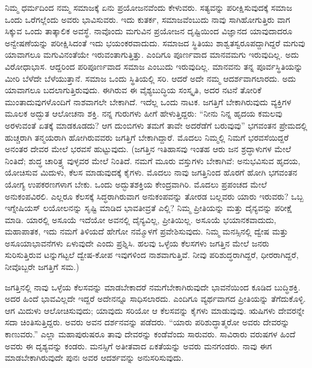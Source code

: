 ನಿಮ್ಮ ಧರ್ಮದಿಂದ ನಮ್ಮ ಸಮಾಜಕ್ಕೆ ಏನು ಪ್ರಯೋಜನವೆಂದು ಕೇಳುವರು. ಸತ್ಯವನ್ನು ಪರೀಕ್ಷಿಸುವುದಕ್ಕೆ ಸಮಾಜ ಒಂದು ಒರೆಗಲ್ಲೆಂದು ಅವರು ಭಾವಿಸುವರು. ಇದು ಕುತರ್ಕ, ಸಮಾಜವೆಂಬುದು ನಾವು ಸಾಗಿಹೋಗುತ್ತಿರು ವಾಗ ಸಿಕ್ಕುವ ಒಂದು ತಾತ್ಕಾಲಿಕ ಅವಸ್ಥೆ. ನಾವೊಂದು ಮಗುವಿನ ಪ್ರಯೋಜನ ದೃಷ್ಟಿಯಿಂದ ವಿಜ್ಞಾನದ ಯಾವುದಾದರೂ ಅನ್ವೇಷಣೆಯನ್ನು ಪರೀಕ್ಷಿಸಿದಂತೆ ಇದು ಭಯಂಕರವಾದುದು. ಸಮಾಜದ ಸ್ಥಿತಿಯು ಶಾಶ್ವತಸ್ವರೂಪದ್ದಾಗಿದ್ದರೆ ಮಗುವು ಯಾವಾಗಲೂ ಮಗುವಿನಂತೆಯೇ ಇರುವಂತಾಗುತ್ತಿತ್ತು. ಎಂದಿಗೂ ಪೂರ್ಣವಾದ ಮಾನವಮಗು ಇರುವುದಿಲ್ಲ. ಅದು ವಿರೋಧಾಭಾಸ. ಆದ್ದರಿಂದ ಪರಿಪೂರ್ಣವಾದ ಸಮಾಜ ಎಂಬುದು ಇರುವುದಿಲ್ಲ. ಮಾನವನು ತನ್ನ ಪೂರ್ವಸ್ಥಿತಿಯನ್ನು ಮೀರಿ ಬೆಳೆದೇ ಬೆಳೆಯುತ್ತಾನೆ. ಸಮಾಜ ಒಂದು ಸ್ಥಿತಿಯಲ್ಲಿ ಸರಿ. ಆದರೆ ಅದೇ ನಮ್ಮ ಆದರ್ಶವಾಗಲಾರದು. ಅದು ಯಾವಾಗಲೂ ಬದಲಾಗುತ್ತಿರುವುದು. ಈಗಿರುವ ಈ ವೈಶ್ಯಬುದ್ಧಿಯ ಸಂಸ್ಕೃತಿ, ಅದರ ನಟನೆ ತೋರಿಕೆ ಮುಂತಾದುವುಗಳೊಂದಿಗೆ ನಾಶವಾಗಲೇ ಬೇಕಾಗಿದೆ. ಇದೆಲ್ಲ ಒಂದು ನಾಟಕ. ಜಗತ್ತಿಗೆ ಬೇಕಾಗಿರುವುದು ವ್ಯಕ್ತಿಗಳ ಮೂಲಕ ಅದ್ಭುತ ಆಲೋಚನಾ ಶಕ್ತಿ. ನನ್ನ ಗುರುಗಳು ಹೀಗೆ ಹೇಳುತ್ತಿದ್ದರು: “ನೀನು ನಿನ್ನ ಹೃದಯ ಕಮಲವು ಅರಳುವಂತೆ ಏತಕ್ಕೆ ಮಾಡಕೂಡದು? ಆಗ ದುಂಬಿಗಳು ತಮಗೆ ತಾವೇ ಅದರೆಡೆಗೆ ಬರುವುವು” ಭಗವಂತನ ಪ್ರೇಮದಲ್ಲಿ ಹುಚ್ಚರಾಗಿ ತನ್ಮಯರಾಗಿ ಹೋಗಿರುವವರು ಜಗತ್ತಿಗೆ ಬೇಕಾಗಿದ್ದಾರೆ. ಮೊದಲು ನಿಮ್ಮಲ್ಲಿ ನಿಮಗೆ ಭರವಸೆಯಿದ್ದರೆ ಅನಂತರ ದೇವರ ಮೇಲೆ ಭರವಸೆ ಹುಟ್ಟುವುದು. (ಜಗತ್ತಿನ ಇತಿಹಾಸವು ಇಂತಹ ಆರು ಜನ ಶ್ರದ್ಧಾಳುಗಳ ಮೇಲೆ ನಿಂತಿದೆ; ಶುದ್ಧ ಚಾರಿತ್ರ್ಯ ವುಳ್ಳವರ ಮೇಲೆ ನಿಂತಿದೆ. ನಮಗೆ ಮೂರು ವಸ್ತುಗಳು ಬೇಕಾಗಿವೆ: ಅನುಭವಿಸುವ ಹೃದಯ, ಯೋಚಿಸುವ ಮಿದುಳು, ಕೆಲಸ ಮಾಡುವುದಕ್ಕೆ ಕೈಗಳು. ಮೊದಲು ನಾವು ಜಗತ್ತಿನಿಂದ ಹೊರಗೆ ಹೋಗಿ ಭಗವಂತನ ಯೋಗ್ಯ ಉಪಕರಣಗಳಾಗ ಬೇಕು. ಒಂದು ಅದ್ಭುತಶಕ್ತಿಯ ಕೇಂದ್ರವಾಗಿರಿ. ಮೊದಲು ಪ್ರಪಂಚದ ಮೇಲೆ ಅನುಕಂಪವಿರಲಿ. ಎಲ್ಲರೂ ಕೆಲಸಕ್ಕೆ ಸಿದ್ಧರಾಗಿರುವಾಗ ಅನುಕಂಪವನ್ನು ತೋರಡ ಬಲ್ಲವರು ಯಾರು ಇರುವರು? ಒಬ್ಬ ಇಗ್ನೇಷಿಯಸ್​ ಲಯೋಲನನ್ನು ಸೃಷ್ಟಿ ಮಾಡಿದ ಭಾವತೀವ್ರತೆ ಎಲ್ಲಿ? ನಿಮ್ಮ ಪ್ರೀತಿಯನ್ನು ಮತ್ತು ದೈನ್ಯವನ್ನು ಪರೀಕ್ಷೆ ಮಾಡಿ. ಯಾರಲ್ಲಿ ಅಸೂಯೆ ಇದೆಯೋ ಅವನಲ್ಲಿ ದೈನ್ಯವಿಲ್ಲ, ಪ್ರೀತಿಯಿಲ್ಲ. ಅಸೂಯೆ ಭಯಾನಕವಾದುದು, ಮಹಾಪಾತಕ, ಇದು ನಮಗೆ ತಿಳಿಯದೆ ಹೇಗೋ ನಮ್ಮೊಳಗೆ ಪ್ರವೇಶಿಸುವುದು. ನಿಮ್ಮ ಮನಸ್ಸಿನಲ್ಲಿ ದ್ವೇಷ ಮತ್ತು ಅಸೂಯಾಭಾವನೆಗಳು ಏಳುವುದೇ ಎಂದು ಪ್ರಶ್ನಿಸಿ. ಹಲವು ಒಳ್ಳೆಯ ಕೆಲಸಗಳು ಜಗತ್ತಿನ ಮೇಲೆ ಜನರು ಸುರಿಸುತ್ತಿರುವ ಟನ್ನುಗಟ್ಟಲೆ ದ್ವೇಷ-ಕೋಪ ಇವುಗಳಿಂದ ನಾಶವಾಗುತ್ತಿವೆ. ನೀವು ಪರಿಶುದ್ಧರಾಗಿದ್ದರೆ, ಧೀರರಾಗಿದ್ದರೆ, ನೀವೊಬ್ಬರೇ ಜಗತ್ತಿಗೆ ಸಮ.)

ಜಗತ್ತಿನಲ್ಲಿ ನಾವು ಒಳ್ಳೆಯ ಕೆಲಸವನ್ನು ಮಾಡಬೇಕಾದರೆ ನಮಗೆಬೇಕಾಗಿರುವುದೇ ಭಾವನೆಯಿಂದ ಕೂಡಿದ ಬುದ್ಧಿಶಕ್ತಿ. ಅದರ ಹಿಂದೆ ಭಾವವಿಲ್ಲದೇ ಇದ್ದರೆ ಅದೇನನ್ನೂ ಸಾಧಿಸಲಾರದು. ಎಂದಿಗೂ ವ್ಯರ್ಥವಾಗದ ಪ್ರೀತಿಯನ್ನು ತೆಗೆದುಕೊಳ್ಳಿ. ಆಗ ಮಿದುಳು ಆಲೋಚಿಸುವುದು; ಯಾವುದು ಸರಿಯೋ ಆ ಕೆಲಸವನ್ನು ಕೈಗಳು ಮಾಡುವುವು. ಋಷಿಗಳು ದೇವರನ್ನೇ ಸದಾ ಚಿಂತಿಸುತ್ತಿದ್ದರು. ಅವರು ಅವನ ದರ್ಶನವನ್ನು ಪಡೆದರು. “ಯಾರು ಪರಿಶುದ್ಧಾತ್ಮರೋ ಅವರು ದೇವರನ್ನು ಕಾಣುವರು.” ಎಲ್ಲಾ ಮಹಾಪುರುಷರೂ ತಾವು ದೇವರನ್ನು ಕಂಡೆವೆಂದು ಸಾರುವರು. ಸಾವಿರಾರು ವರುಷಗಳ ಹಿಂದೆ ಅವರು ಈ ದೃಶ್ಯವನ್ನು ಕಂಡರು. ಮನಸ್ಸಿಗೆ ಅತೀತವಾದ ಏಕತೆಯನ್ನು ಅವರು ಮನಗಂಡರು. ನಾವು ಈಗ ಮಾಡಬೇಕಾಗಿರುವುದೇ ಪುನಃ ಅವರ ಆದರ್ಶವನ್ನು ಅನುಸರಿಸುವುದು.

